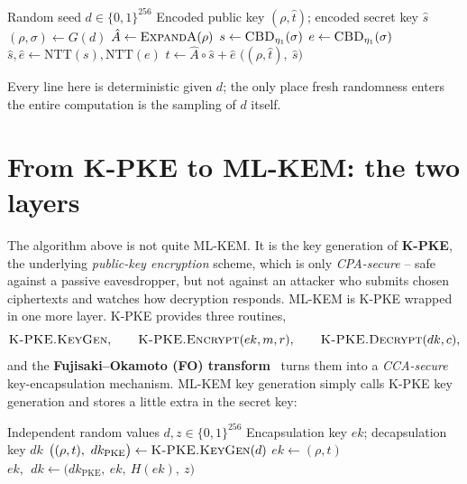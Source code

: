 \begin{algorithm}[H]
\caption{K-PKE.KeyGen (FIPS 203~\cite{fips203}, teaching form)}
\label{alg:kpke-keygen}
\begin{algorithmic}[1]
\Require Random seed $d \in \{0,1\}^{256}$
\Ensure Encoded public key $(\rho,\hat t)$; encoded secret key $\hat s$
\State $(\rho,\sigma) \gets G(d)$ 
\State $\hat A \gets \textsc{ExpandA}(\rho)$ 
\State $s \gets \textsc{CBD}_{\eta_1}(\sigma)$ 
\State $e \gets \textsc{CBD}_{\eta_1}(\sigma)$ 
\State $\hat s,\hat e \gets \mathrm{NTT}(s),\mathrm{NTT}(e)$
\State $\hat t \gets \hat A\circ\hat s+\hat e$ 
\State \Return $\big((\rho,\hat t),\ \hat s\big)$ 
\end{algorithmic}
\end{algorithm}

Every line here is deterministic given $d$; the only place fresh randomness enters the entire computation is the sampling of $d$ itself.

\section{From K-PKE to ML-KEM: the two layers}

The algorithm above is not quite ML-KEM. It is the key generation of \textbf{K-PKE}, the underlying \emph{public-key encryption} scheme, which is only \emph{CPA-secure} -- safe against a passive eavesdropper, but not against an attacker who submits chosen ciphertexts and watches how decryption responds. ML-KEM is K-PKE wrapped in one more layer. K-PKE provides three routines,
\[
\textsc{K-PKE.KeyGen},\qquad \textsc{K-PKE.Encrypt}(ek, m, r),\qquad \textsc{K-PKE.Decrypt}(dk, c),
\]
and the \textbf{Fujisaki--Okamoto (FO) transform}~\cite{fo1999} turns them into a \emph{CCA-secure} key-encapsulation mechanism. ML-KEM key generation simply calls K-PKE key generation and stores a little extra in the secret key:

\begin{algorithm}[H]
\caption{ML-KEM.KeyGen (teaching form)}
\label{alg:mlkem-keygen}
\begin{algorithmic}[1]
\Require Independent random values $d,z \in \{0,1\}^{256}$
\Ensure Encapsulation key $ek$; decapsulation key $dk$
\State $\big((\rho,t),\ dk_{\mathrm{PKE}}\big) \gets \textsc{K-PKE.KeyGen}(d)$ 
\State $ek \gets (\rho, t)$
\State \Return $ek,\ \ dk \gets \big(dk_{\mathrm{PKE}},\ ek,\ H(ek),\ z\big)$
\end{algorithmic}
\end{algorithm}

